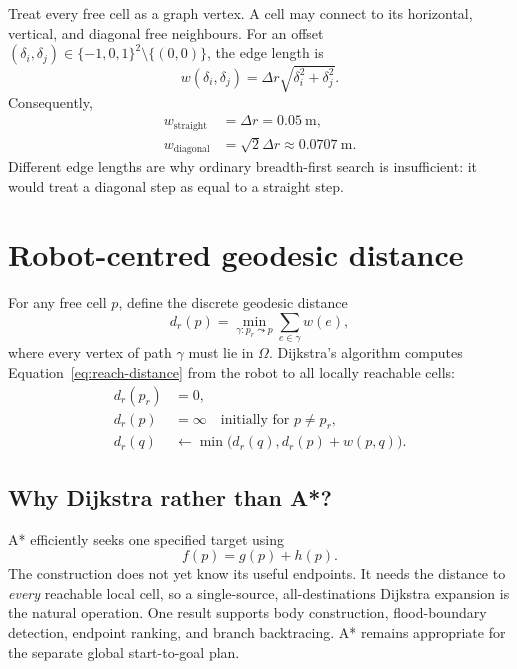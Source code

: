 \documentclass[11pt,a4paper]{article}
\newcommand{\Free}{\Omega}
\begin{document}
Treat every free cell as a graph vertex. A cell may connect to its horizontal,
vertical, and diagonal free neighbours. For an offset
$(\delta_i,\delta_j)\in\{-1,0,1\}^2\setminus\{(0,0)\}$, the edge length is
\begin{equation}
  w(\delta_i,\delta_j)
  =\Delta r\sqrt{\delta_i^2+\delta_j^2}.
\end{equation}
Consequently,
\begin{align}
  w_{\mathrm{straight}}&=\Delta r=0.05\ \mathrm{m},\\
  w_{\mathrm{diagonal}}&=\sqrt{2}\Delta r\approx0.0707\ \mathrm{m}.
\end{align}
Different edge lengths are why ordinary breadth-first search is insufficient:
it would treat a diagonal step as equal to a straight step.

\section{Robot-centred geodesic distance}

For any free cell $p$, define the discrete geodesic distance
\begin{equation}
  d_r(p)=
  \min_{\gamma:p_r\leadsto p}
  \sum_{e\in\gamma}w(e),
  \label{eq:reach-distance}
\end{equation}
where every vertex of path $\gamma$ must lie in $\Free$. Dijkstra's algorithm
computes Equation~\eqref{eq:reach-distance} from the robot to all locally
reachable cells:
\begin{align}
  d_r(p_r)&=0,\\
  d_r(p)&=\infty \quad \text{initially for }p\ne p_r,\\
  d_r(q)&\leftarrow
  \min\bigl(d_r(q),d_r(p)+w(p,q)\bigr).
\end{align}

\subsection{Why Dijkstra rather than A*?}

A* efficiently seeks one specified target using
\begin{equation}
  f(p)=g(p)+h(p).
\end{equation}
The construction does not yet know its useful endpoints. It needs the
distance to \emph{every} reachable local cell, so a single-source,
all-destinations Dijkstra expansion is the natural operation. One result
supports body construction, flood-boundary detection, endpoint ranking, and
branch backtracing. A* remains appropriate for the separate global
start-to-goal plan.
\end{document}
